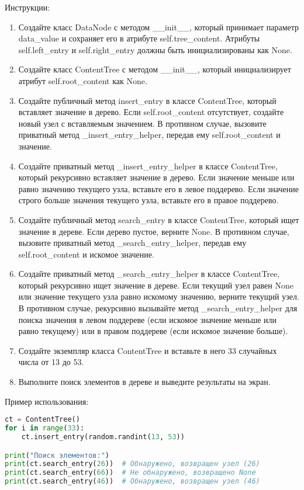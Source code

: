 \begin{enumerate}
Инструкции:
\begin{enumerate}
    \item Создайте класс DataNode с методом \_\_init\_\_, который принимает параметр data\_value и сохраняет его в атрибуте self.tree\_content. Атрибуты self.left\_entry и self.right\_entry должны быть инициализированы как None.
    \item Создайте класс ContentTree с методом \_\_init\_\_, который инициализирует атрибут self.root\_content как None.
    \item Создайте публичный метод insert\_entry в классе ContentTree, который вставляет значение в дерево. Если self.root\_content отсутствует, создайте новый узел с вставляемым значением. В противном случае, вызовите приватный метод \_insert\_entry\_helper, передав ему self.root\_content и значение.
    \item Создайте приватный метод \_insert\_entry\_helper в классе ContentTree, который рекурсивно вставляет значение в дерево. Если значение меньше или равно значению текущего узла, вставьте его в левое поддерево. Если значение строго больше значения текущего узла, вставьте его в правое поддерево.
    \item Создайте публичный метод search\_entry в классе ContentTree, который ищет значение в дереве. Если дерево пустое, верните None. В противном случае, вызовите приватный метод \_search\_entry\_helper, передав ему self.root\_content и искомое значение.
    \item Создайте приватный метод \_search\_entry\_helper в классе ContentTree, который рекурсивно ищет значение в дереве. Если текущий узел равен None или значение текущего узла равно искомому значению, верните текущий узел. В противном случае, рекурсивно вызывайте метод \_search\_entry\_helper для поиска значения в левом поддереве (если искомое значение меньше или равно текущему) или в правом поддереве (если искомое значение больше).
    \item Создайте экземпляр класса ContentTree и вставьте в него 33 случайных числа от 13 до 53.
    \item Выполните поиск элементов в дереве и выведите результаты на экран.
\end{enumerate}

Пример использования:
\begin{lstlisting}[language=Python]
ct = ContentTree()
for i in range(33):
    ct.insert_entry(random.randint(13, 53))

print("Поиск элементов:")
print(ct.search_entry(26))  # Обнаружено, возвращен узел (26)
print(ct.search_entry(66))  # Не обнаружено, возвращено None
print(ct.search_entry(46))  # Обнаружено, возвращен узел (46)
\end{lstlisting}


\end{enumerate}

